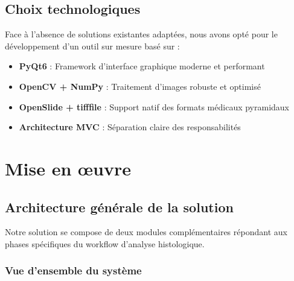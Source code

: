 \documentclass[11pt,a4paper]{report}
\begin{document}
\section{Choix technologiques}

Face à l'absence de solutions existantes adaptées, nous avons opté pour le développement d'un outil sur mesure basé sur :

\begin{itemize}
\item \textbf{PyQt6} : Framework d'interface graphique moderne et performant
\item \textbf{OpenCV + NumPy} : Traitement d'images robuste et optimisé
\item \textbf{OpenSlide + tifffile} : Support natif des formats médicaux pyramidaux
\item \textbf{Architecture MVC} : Séparation claire des responsabilités
\end{itemize}

\chapter{Mise en œuvre}

\section{Architecture générale de la solution}

Notre solution se compose de deux modules complémentaires répondant aux phases spécifiques du workflow d'analyse histologique.

\subsection{Vue d'ensemble du système}
\end{document}
